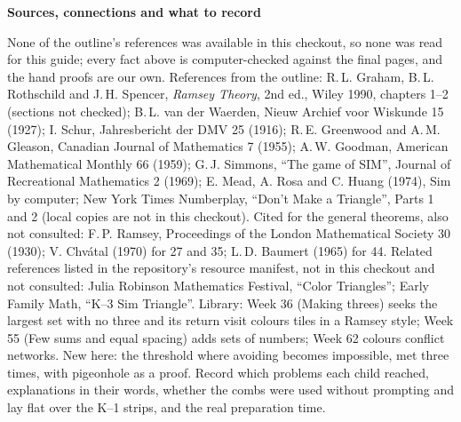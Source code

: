 \documentclass[11pt]{article}
\newcommand{\head}[1]{\par\needspace{8\baselineskip}\medskip\textbf{\large #1}\par}
\begin{document}
\head{Sources, connections and what to record}
None of the outline's references was available in this checkout, so none was read for this guide; every fact above is computer-checked against the final pages, and the hand proofs are our own. References from the outline: R.\,L. Graham, B.\,L. Rothschild and J.\,H. Spencer, \emph{Ramsey Theory}, 2nd ed., Wiley 1990, chapters 1--2 (sections not checked); B.\,L. van der Waerden, Nieuw Archief voor Wiskunde 15 (1927); I. Schur, Jahresbericht der DMV 25 (1916); R.\,E. Greenwood and A.\,M. Gleason, Canadian Journal of Mathematics 7 (1955); A.\,W. Goodman, American Mathematical Monthly 66 (1959); G.\,J. Simmons, ``The game of SIM'', Journal of Recreational Mathematics 2 (1969); E. Mead, A. Rosa and C. Huang (1974), Sim by computer; New York Times Numberplay, ``Don't Make a Triangle'', Parts 1 and 2 (local copies are not in this checkout). Cited for the general theorems, also not consulted: F.\,P. Ramsey, Proceedings of the London Mathematical Society 30 (1930); V. Chv\'atal (1970) for 27 and 35; L.\,D. Baumert (1965) for 44. Related references listed in the repository's resource manifest, not in this checkout and not consulted: Julia Robinson Mathematics Festival, ``Color Triangles''; Early Family Math, ``K--3 Sim Triangle''. Library: Week 36 (Making threes) seeks the largest set with no three and its return visit colours tiles in a Ramsey style; Week 55 (Few sums and equal spacing) adds sets of numbers; Week 62 colours conflict networks. New here: the threshold where avoiding becomes impossible, met three times, with pigeonhole as a proof. Record which problems each child reached, explanations in their words, whether the combs were used without prompting and lay flat over the K--1 strips, and the real preparation time.
\end{document}
